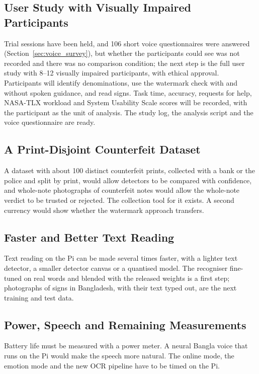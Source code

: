 \subsection{User Study with Visually Impaired Participants}
\label{sec:future_user_study}
Trial sessions have been held, and 106 short voice questionnaires were answered (Section~\ref{sec:voice_survey}), but whether the participants could see was not recorded and there was no comparison condition; the next step is the full user study with 8--12 visually impaired participants, with ethical approval. Participants will identify denominations, use the watermark check with and without spoken guidance, and read signs. Task time, accuracy, requests for help, NASA-TLX workload and System Usability Scale scores will be recorded, with the participant as the unit of analysis. The study log, the analysis script and the voice questionnaire are ready.

\subsection{A Print-Disjoint Counterfeit Dataset}
A dataset with about 100 distinct counterfeit prints, collected with a bank or the police and split by print, would allow detectors to be compared with confidence, and whole-note photographs of counterfeit notes would allow the whole-note verdict to be trusted or rejected. The collection tool for it exists. A second currency would show whether the watermark approach transfers.

\subsection{Faster and Better Text Reading}
Text reading on the Pi can be made several times faster, with a lighter text detector, a smaller detector canvas or a quantised model. The recogniser fine-tuned on real words and blended with the released weights is a first step; photographs of signs in Bangladesh, with their text typed out, are the next training and test data.

\subsection{Power, Speech and Remaining Measurements}
Battery life must be measured with a power meter. A neural Bangla voice that runs on the Pi would make the speech more natural. The online mode, the emotion mode and the new OCR pipeline have to be timed on the Pi.

